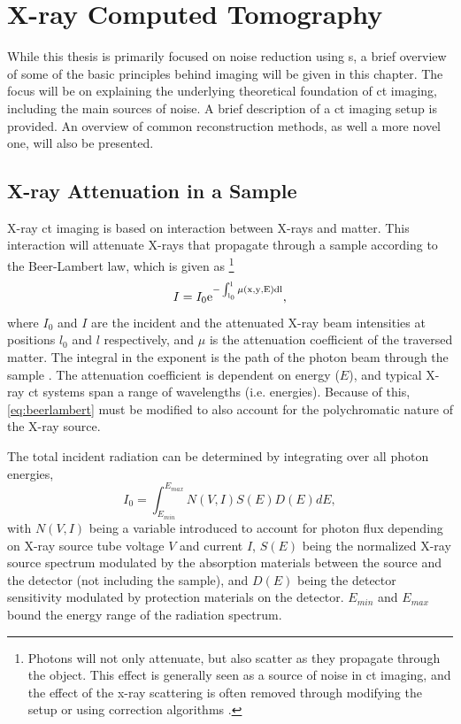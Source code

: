 \chapter{X-ray Computed Tomography}
\label{sec:ct}
While this thesis is primarily focused on noise reduction using s, a brief overview of some of the basic principles behind  imaging will be given in this chapter. The focus will be on explaining the underlying theoretical foundation of \gls{ct} imaging, including the main sources of noise. A brief description of a \gls{ct} imaging setup is provided. An overview of common reconstruction methods, as well a more novel one, will also be presented.

\section{X-ray Attenuation in a Sample}
\label{sec:ct:theoreticalfoundation}
X-ray \gls{ct} imaging is based on interaction between X-rays and matter. This interaction will attenuate X-rays that propagate through a sample according to the Beer-Lambert law, which is given as \cite{doi:10.1063/1.4950807} \footnote{Photons will not only attenuate, but also scatter as they propagate through the object. This effect is generally seen as a source of noise in \gls{ct} imaging, and the effect of the x-ray scattering is often removed through modifying the setup or using correction algorithms \cite{10.1118/1.1711475}.}
\begin{equation}
    \label{eq:beerlambert}
    I = I_0 \rm{e}^{-\int_{l_0}^{l}\mu\left(x,y,E\right)dl},
\end{equation}
where $I_0$ and $I$ are the incident and the attenuated X-ray beam intensities at positions $l_0$ and $l$ respectively, and $\mu$ is the attenuation coefficient of the traversed matter. The integral in the exponent is the path of the photon beam through the sample \cite{KakSlaney98}. The attenuation coefficient is dependent on energy ($E$), and typical X-ray \gls{ct} systems span a range of wavelengths (i.e. energies). Because of this, \cref{eq:beerlambert} must be modified to also account for the polychromatic nature of the X-ray source. 

The total incident radiation can be determined by integrating over all photon energies, 
\begin{equation}
    \label{eq:incidentradiation}
    I_0 = \int_{E_{min}}^{E_{max}}N\left(V,I\right)S\left(E\right)D\left(E\right)dE,
\end{equation}
with $N\left(V,I\right)$ being a variable introduced to account for photon flux depending on X-ray source tube voltage $V$ and current $I$, $S\left(E\right)$ being the normalized X-ray source spectrum modulated by the absorption materials between the source and the detector (not including the sample), and $D\left(E\right)$ being the detector sensitivity modulated by protection materials on the detector. $E_{min}$ and $E_{max}$ bound the energy range of the radiation spectrum. 

